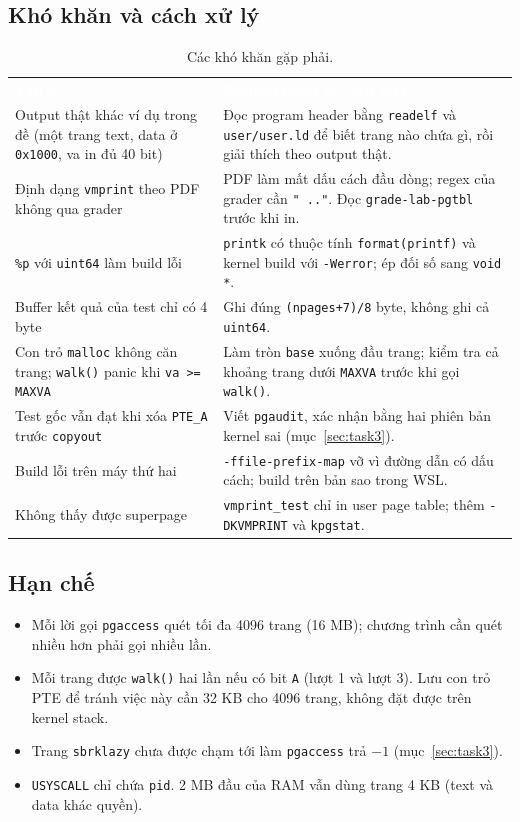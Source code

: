 \documentclass[10pt,a4paper]{article}
\newcommand{\cc}[1]{\texttt{#1}}
\newcommand{\thd}[1]{\textcolor{white}{\textbf{#1}}}
\newcommand{\headrow}{\rowcolor{hcmus}}
\begin{document}
\subsection{Khó khăn và cách xử lý}
\begin{table}[H]
\centering\small
\begin{tabularx}{\linewidth}{@{}>{\raggedright\arraybackslash}p{4.6cm} >{\raggedright\arraybackslash}X@{}}
\headrow \thd{Vấn đề} & \thd{Nguyên nhân và cách xử lý} \\
Output thật khác ví dụ trong đề (một trang text, data ở \cc{0x1000}, va in đủ 40 bit) & Đọc program header bằng \cc{readelf} và \cc{user/user.ld} để biết trang nào chứa gì, rồi giải thích theo output thật. \\
\rowcolor{rowalt}
Định dạng \cc{vmprint} theo PDF không qua grader & PDF làm mất dấu cách đầu dòng; regex của grader cần \cc{" .."}. Đọc \cc{grade-lab-pgtbl} trước khi in. \\
\cc{\%p} với \cc{uint64} làm build lỗi & \cc{printk} có thuộc tính \cc{format(printf)} và kernel build với \cc{-Werror}; ép đối số sang \cc{void *}. \\
\rowcolor{rowalt}
Buffer kết quả của test chỉ có 4 byte & Ghi đúng \cc{(npages+7)/8} byte, không ghi cả \cc{uint64}. \\
Con trỏ \cc{malloc} không căn trang; \cc{walk()} panic khi \cc{va >= MAXVA} & Làm tròn \cc{base} xuống đầu trang; kiểm tra cả khoảng trang dưới \cc{MAXVA} trước khi gọi \cc{walk()}. \\
\rowcolor{rowalt}
Test gốc vẫn đạt khi xóa \cc{PTE\_A} trước \cc{copyout} & Viết \cc{pgaudit}, xác nhận bằng hai phiên bản kernel sai (mục~\ref{sec:task3}). \\
Build lỗi trên máy thứ hai & \cc{-ffile-prefix-map} vỡ vì đường dẫn có dấu cách; build trên bản sao trong WSL. \\
\rowcolor{rowalt}
Không thấy được superpage & \cc{vmprint\_test} chỉ in user page table; thêm \cc{-DKVMPRINT} và \cc{kpgstat}. \\
\bottomrule
\end{tabularx}
\caption{Các khó khăn gặp phải.}
\end{table}

\subsection{Hạn chế}
\begin{itemize}
  \item Mỗi lời gọi \cc{pgaccess} quét tối đa 4096 trang (16 MB); chương trình cần quét nhiều hơn phải gọi nhiều lần.
  \item Mỗi trang được \cc{walk()} hai lần nếu có bit \cc{A} (lượt 1 và lượt 3). Lưu con trỏ PTE để tránh việc này cần 32 KB cho 4096 trang, không đặt được trên kernel stack.
  \item Trang \cc{sbrklazy} chưa được chạm tới làm \cc{pgaccess} trả $-1$ (mục~\ref{sec:task3}).
  \item \cc{USYSCALL} chỉ chứa \cc{pid}. 2 MB đầu của RAM vẫn dùng trang 4 KB (text và data khác quyền).
\end{itemize}
\end{document}
